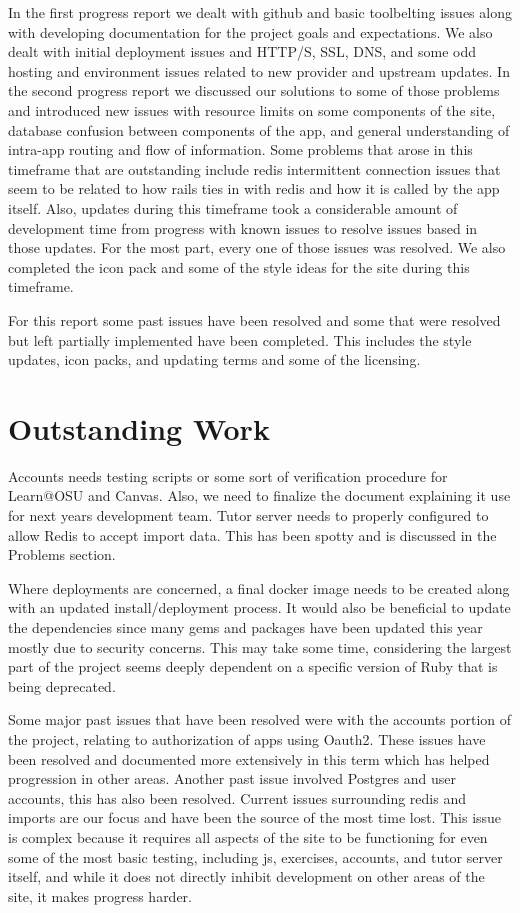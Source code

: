 \documentclass[onecolumn, draftclsnofoot,10pt, compsoc]{IEEEtran}
\begin{document}
In the first progress report we dealt with github and basic toolbelting issues along with developing documentation for the project goals and expectations. We also dealt with initial deployment issues and HTTP/S, SSL, DNS, and some odd hosting and environment issues related to new provider and upstream updates. 
In the second progress report we discussed our solutions to some of those problems and introduced new issues with resource limits on some components of the site, database confusion between components of the app, and general understanding of intra-app routing and flow of information. Some problems that arose in this timeframe that are outstanding include redis intermittent connection issues that seem to be related to how rails ties in with redis and how it is called by the app itself. Also, updates during this timeframe took a considerable amount of development time from progress with known issues to resolve issues based in those updates. For the most part, every one of those issues was resolved. We also completed the icon pack and some of the style ideas for the site during this timeframe. 

For this report some past issues have been resolved and some that were resolved but left partially implemented have been completed. This includes the style updates, icon packs, and updating terms and some of the licensing. 


\section{Outstanding Work}
Accounts needs testing scripts or some sort of verification procedure for Learn@OSU and Canvas. Also, we need to finalize the document explaining it use for next years development team. Tutor server needs to properly configured to allow Redis to accept import data. This has been spotty and is discussed in the Problems section. 

Where deployments are concerned, a final docker image needs to be created along with an updated install/deployment process. It would also be beneficial to update the dependencies since many gems and packages have been updated this year mostly due to security concerns. This may take some time, considering the largest part of the project seems deeply dependent on a specific version of Ruby that is being deprecated. 

Some major past issues that have been resolved were with the accounts portion of the project, relating to authorization of apps using Oauth2. These issues have been resolved and documented more extensively in this term which has helped progression in other areas. Another past issue involved Postgres and user accounts, this has also been resolved. Current issues surrounding redis and imports are our focus and have been the source of the most time lost. This issue is complex because it requires all aspects of the site to be functioning for even some of the most basic testing, including js, exercises, accounts, and tutor server itself, and while it does not directly inhibit development on other areas of the site, it makes progress harder. 
\end{document}
